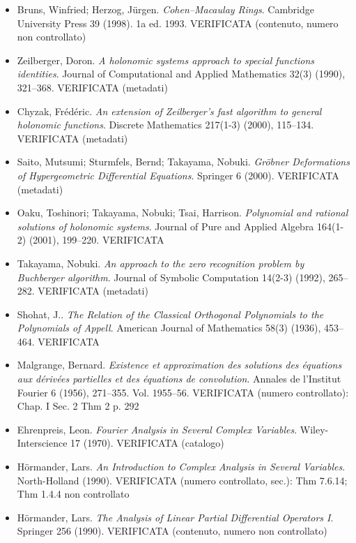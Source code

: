 \documentclass[11pt]{article}
\theoremstyle{plain}
\theoremstyle{definition}
\theoremstyle{remark}
\begin{document}
\begin{itemize}[itemsep=2pt,leftmargin=1.2em,font=\small]
\item Bruns, Winfried; Herzog, J{\"u}rgen. \emph{Cohen--Macaulay Rings}. Cambridge University Press 39 (1998). \textsf{\footnotesize 1a ed. 1993. VERIFICATA (contenuto, numero non controllato)}
\item Zeilberger, Doron. \emph{A holonomic systems approach to special functions identities}. Journal of Computational and Applied Mathematics 32(3) (1990), 321--368. \textsf{\footnotesize VERIFICATA (metadati)}
\item Chyzak, Fr{\'e}d{\'e}ric. \emph{An extension of {Z}eilberger's fast algorithm to general holonomic functions}. Discrete Mathematics 217(1-3) (2000), 115--134. \textsf{\footnotesize VERIFICATA (metadati)}
\item Saito, Mutsumi; Sturmfels, Bernd; Takayama, Nobuki. \emph{Gr{\"o}bner Deformations of Hypergeometric Differential Equations}. Springer 6 (2000). \textsf{\footnotesize VERIFICATA (metadati)}
\item Oaku, Toshinori; Takayama, Nobuki; Tsai, Harrison. \emph{Polynomial and rational solutions of holonomic systems}. Journal of Pure and Applied Algebra 164(1-2) (2001), 199--220. \textsf{\footnotesize VERIFICATA}
\item Takayama, Nobuki. \emph{An approach to the zero recognition problem by {B}uchberger algorithm}. Journal of Symbolic Computation 14(2-3) (1992), 265--282. \textsf{\footnotesize VERIFICATA (metadati)}
\item Shohat, J.. \emph{The Relation of the Classical Orthogonal Polynomials to the Polynomials of {A}ppell}. American Journal of Mathematics 58(3) (1936), 453--464. \textsf{\footnotesize VERIFICATA}
\item Malgrange, Bernard. \emph{Existence et approximation des solutions des {\'e}quations aux d{\'e}riv{\'e}es partielles et des {\'e}quations de convolution}. Annales de l'Institut Fourier 6 (1956), 271--355. \textsf{\footnotesize Vol. 1955--56. VERIFICATA (numero controllato): Chap. I Sec. 2 Thm 2 p. 292}
\item Ehrenpreis, Leon. \emph{Fourier Analysis in Several Complex Variables}. Wiley-Interscience 17 (1970). \textsf{\footnotesize VERIFICATA (catalogo)}
\item H{\"o}rmander, Lars. \emph{An Introduction to Complex Analysis in Several Variables}. North-Holland (1990). \textsf{\footnotesize VERIFICATA (numero controllato, sec.): Thm 7.6.14; Thm 1.4.4 non controllato}
\item H{\"o}rmander, Lars. \emph{The Analysis of Linear Partial Differential Operators {I}}. Springer 256 (1990). \textsf{\footnotesize VERIFICATA (contenuto, numero non controllato)}

\end{itemize}
\end{document}
